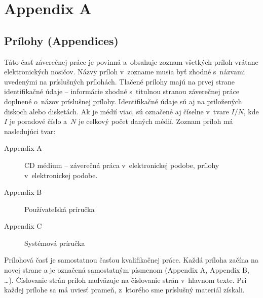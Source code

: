 \section*{Appendix A}
\subsection*{Pr\'ilohy (Appendices)}


Táto časť\/ záverečnej práce je povinná a~obsahuje zoznam všetkých
príloh vrátane elektronických nosičov. Názvy príloh v~zozname musia
byť\/ zhodné s~názvami uvedenými na príslušných prílohách. Tlačené
prílohy majú na prvej strane identifikačné údaje -- informácie zhodné
s~titulnou stranou záverečnej práce doplnené o~názov príslušnej
prílohy. Identifikačné údaje sú aj na priložených diskoch alebo
disketách. Ak je médií viac, sú označené aj číselne v~tvare $I/N$, kde
$I$ je poradové číslo a~$N$ je celkový počet daných médií. Zoznam
príloh má nasledujúci tvar:
\begin{description}
\item[Appendix A] CD médium -- záverečná práca v~elektronickej podobe,
prílohy v~elektronickej podobe.
\item[Appendix B] Používateľská príručka
\item[Appendix C] Systémová príručka
\end{description}
Prílohová časť\/ je samostatnou časťou kvalifikačnej práce. Každá
príloha začína na novej strane a je označená samostatným písmenom
(Appendix A, Appendix B, \dots). Číslovanie strán príloh nadväzuje na
číslovanie strán v~hlavnom texte. Pri každej prílohe sa má uviesť\/
prameň, z~ktorého sme príslušný materiál získali.